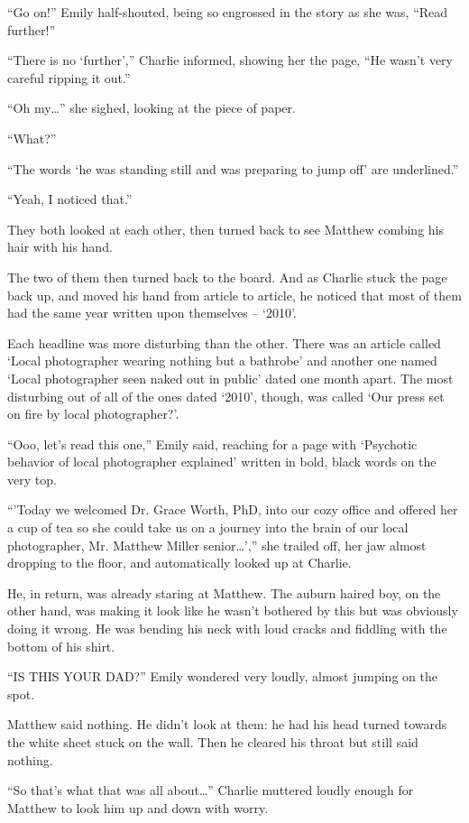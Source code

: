 “Go on!” Emily half-shouted, being so engrossed in the story as she was, “Read further!”

“There is no ‘further’,” Charlie informed, showing her the page, “He wasn’t very careful ripping it out.”

“Oh my…” she sighed, looking at the piece of paper.

“What?”

“The words ‘he was standing still and was preparing to jump off’ are underlined.”

“Yeah, I noticed that.”

They both looked at each other, then turned back to see Matthew combing his hair with his hand. 

The two of them then turned back to the board. And as Charlie stuck the page back up, and moved his hand from article to article, he noticed that most of them had the same year written upon themselves – ‘2010’.

Each headline was more disturbing than the other. There was an article called ‘Local photographer wearing nothing but a bathrobe’ and another one named ‘Local photographer seen naked out in public’ dated one month apart. The most disturbing out of all of the ones dated ‘2010’, though, was called ‘Our press set on fire by local photographer?’.

“Ooo, let’s read this one,” Emily said, reaching for a page with ‘Psychotic behavior of local photographer explained’ written in bold, black words on the very top.

“’Today we welcomed Dr. Grace Worth, PhD, into our cozy office and offered her a cup of tea so she could take us on a journey into the brain of our local photographer, Mr. Matthew Miller senior…’,” she trailed off, her jaw almost dropping to the floor, and automatically looked up at Charlie.

He, in return, was already staring at Matthew. The auburn haired boy, on the other hand, was making it look like he wasn’t bothered by this but was obviously doing it wrong. He was bending his neck with loud cracks and fiddling with the bottom of his shirt.

“IS THIS YOUR DAD?” Emily wondered very loudly, almost jumping on the spot.

Matthew said nothing. He didn’t look at them: he had his head turned towards the white sheet stuck on the wall. Then he cleared his throat but still said nothing.

“So that’s what that was all about…” Charlie muttered loudly enough for Matthew to look him up and down with worry.


